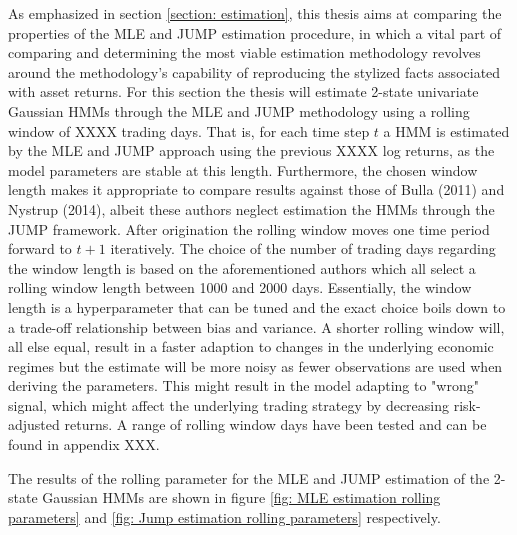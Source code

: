 As emphasized in section \ref{section: estimation}, this thesis aims at comparing the properties of the MLE and JUMP estimation procedure, in which a vital part of comparing and determining the most viable estimation methodology revolves around the methodology's capability of reproducing the stylized facts associated with asset returns. For this section the thesis will estimate 2-state univariate Gaussian HMMs through the MLE and JUMP methodology using a rolling window of XXXX trading days. That is, for each time step $t$ a HMM is estimated by the MLE and JUMP approach using the previous XXXX log returns, as the model parameters are stable at this length. Furthermore, the chosen window length makes it appropriate to compare results against those of Bulla (2011) and Nystrup (2014), albeit these authors neglect estimation the HMMs through the JUMP framework. After origination the rolling window moves one time period forward to $t+1$ iteratively. The choice of the number of trading days regarding the window length is based on the aforementioned authors which all select a rolling window length between 1000 and 2000 days. Essentially, the window length is a hyperparameter that can be tuned and the exact choice boils down to a trade-off relationship between bias and variance. A shorter rolling window will, all else equal, result in a faster adaption to changes in the underlying economic regimes but the estimate will be more noisy as fewer observations are used when deriving the parameters. This might result in the model adapting to "wrong" signal, which might affect the underlying trading strategy by decreasing risk-adjusted returns. A range of rolling window days have been tested and can be found in appendix XXX.

The results of the rolling parameter for the MLE and JUMP estimation of the 2-state Gaussian HMMs are shown in figure \ref{fig: MLE estimation rolling parameters} and \ref{fig: Jump estimation rolling parameters} respectively.

